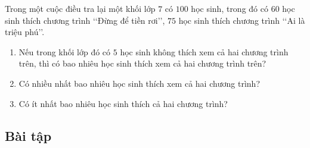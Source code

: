 \begin{vd}%
	Trong một cuộc điều tra lại một khối lớp $7$ có $100$ học sinh, trong đó có $60$ học sinh thích chương trình \lq\lq Đừng để tiền rơi\rq\rq, $75$ học sinh thích chương trình \lq\lq Ai là triệu phú\rq\rq.
	\begin{enumerate}
		\item Nếu trong khối lớp đó có $5$ học sinh không thích xem cả hai chương trình trên, thì có bao nhiêu học sinh thích xem cả hai chương trình trên?
		\item Có nhiều nhất bao nhiêu học sinh thích xem cả hai chương trình?
		\item Có ít nhất bao nhiêu học sinh thích cả hai chương trình?
	\end{enumerate}
\end{vd}

\subsection{Bài tập}
